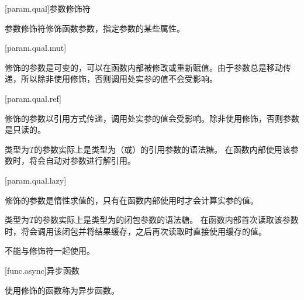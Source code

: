 [param.qual]{参数修饰符}

\pnum
参数修饰符修饰函数参数，指定参数的某些属性。

[param.qual.mut]{}

\pnum
{}修饰的参数是可变的，可以在函数内部被修改或重新赋值。\enternote 由于参数总是移动传递，所以除非使用修饰，否则调用处实参的值不会受影响。\exitnote

[param.qual.ref]{}

\pnum
{}修饰的参数以引用方式传递，调用处实参的值会受影响。除非使用修饰，否则参数是只读的。

\pnum
类型为$T$的参数实际上是类型为（或）的引用参数的语法糖。
在函数内部使用该参数时，将会自动对参数进行解引用。

[param.qual.lazy]{}

\pnum
{}修饰的参数是惰性求值的，只有在函数内部使用时才会计算实参的值。

\pnum
类型为$T$的参数实际上是类型为的闭包参数的语法糖。
在函数内部首次读取该参数时，将会调用该闭包并将结果缓存，之后再次读取时直接使用缓存的值。

\pnum
{}不能与修饰符一起使用。

[func.async]{异步函数}

\pnum
使用修饰的函数称为异步函数。